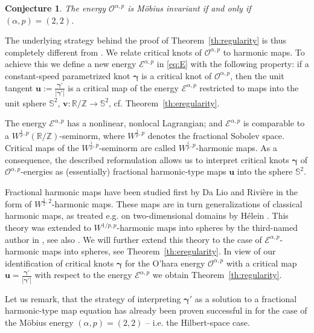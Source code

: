 \documentclass[a4paper,10pt,intlimits,ngerman]{amsart}
\newtheorem{conjecture}[theorem]{Conjecture}
\numberwithin{equation}{section}
\newcommand{\R}{\mathbb{R}}
\newcommand{\Z}{\mathbb{Z}}
\renewcommand{\S}{\mathbb{S}}
\newcommand{\solv}{{\boldsymbol{v}}}
\newcommand{\sol}{{\boldsymbol{\gamma}}}
\newcommand{\solu}{{\boldsymbol{u}}}
\begin{document}
\begin{conjecture}\label{conj}
The energy $\mathcal{O}^{\alpha,p}$ is M\"obius invariant if and only if $(\alpha,p) = (2,2)$.
\end{conjecture}
% 
The underlying strategy behind the proof of Theorem~\ref{th:regularity} is thus completely different from \cite{Freedman1994}. We relate critical knots of $\mathcal{O}^{\alpha,p}$ to harmonic maps. To achieve this we define a new energy $\mathcal{E}^{\alpha,p}$ in \eqref{eq:E}  with the following property: if a constant-speed parametrized knot $\sol$ is a critical knot of $\mathcal{O}^{\alpha,p}$, then the unit 
tangent  $\solu:= \frac {\sol'}{|\sol'|}$  is a critical map of the energy
$
 \mathcal{E}^{\alpha,p} 
$
restricted to maps into the unit sphere $\S^2$, $\solv: \mathbb R / \mathbb Z \rightarrow \mathbb S^2$, cf. Theorem~\ref{th:eregularity}. 

The energy $\mathcal{E}^{\alpha,p}$ has a nonlinear, nonlocal Lagrangian; and $\mathcal{E}^{\alpha,p}$ is comparable to a $W^{\frac{1}{p},p}(\R/\Z)$-seminorm, where $W^{\frac{1}{p},p}$ denotes the fractional Sobolev space. Critical maps of the $W^{\frac{1}{p},p}$-seminorm are called $W^{\frac{1}{p},p}$-harmonic maps. As a consequence, the described reformulation allows us to interpret critical knots $\sol$ of $\mathcal{O}^{\alpha,p}$-energies as (essentially) fractional harmonic-type maps $\solu$ into the sphere $\S^2$.

Fractional harmonic maps have been studied first by Da Lio and Rivi\`{e}re \cite{DR1dSphere,DR1dMan} in the form of $W^{\frac{1}{2},2}$-harmonic maps. These maps are in turn generalizations of classical harmonic maps, as treated e.g. on two-dimensional domains by H\'elein \cite{Helein-1990}. This theory was extended to $W^{1/p,p}$-harmonic maps into spheres by the third-named author in \cite{SchikorraCPDE14}, see also \cite{MS18}. We will further extend this theory to the case of $\mathcal{E}^{\alpha,p}$-harmonic maps into spheres, see Theorem~\ref{th:eregularity}.  In view of our identification of critical knots $\sol$ for the O'hara energy $\mathcal{O}^{\alpha,p}$ with a critical map $\solu=\frac{\sol'}{|\sol'|}$ with respect to the energy $\mathcal{E}^{\alpha,p}$ we obtain Theorem~\ref{th:regularity}.

Let us remark, that the strategy of interpreting $\sol'$ as a solution to a fractional harmonic-type map equation has already been proven successful in \cite{BRS16} for the case of the M\"obius energy $(\alpha,p) = (2,2)$ -- i.e. the Hilbert-space case. 
\end{document}

